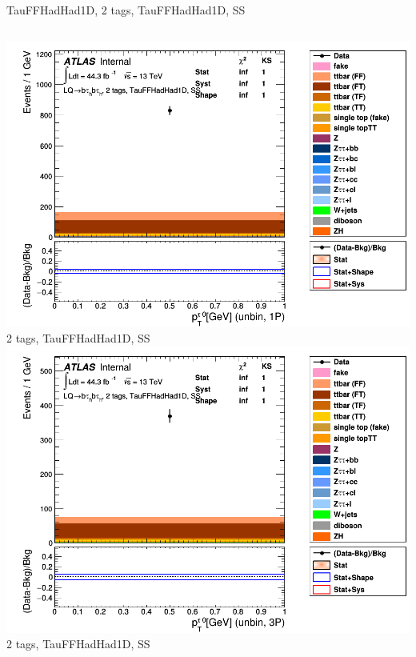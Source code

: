 \begin{frame}{TauFFHadHad1D, 2 tags, TauFFHadHad1D, SS}
\begin{columns}[c]
    \centering\includegraphics[width=\textwidth]{C_2tag2pjet_0ptv_SS_UnbinLeadTau1P}\\
    2 tags, TauFFHadHad1D, SS
    \centering\includegraphics[width=\textwidth]{C_2tag2pjet_0ptv_SS_UnbinLeadTau3P}\\
    2 tags, TauFFHadHad1D, SS
  \end{columns}
\end{frame}

